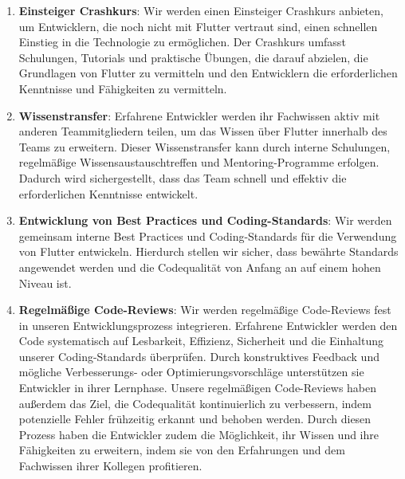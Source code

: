 \begin{enumerate}
    \item \textbf{Einsteiger Crashkurs}: Wir werden einen Einsteiger Crashkurs anbieten, um Entwicklern, die noch nicht mit Flutter vertraut sind, einen schnellen Einstieg in die Technologie zu ermöglichen. Der Crashkurs umfasst Schulungen, Tutorials und praktische Übungen, die darauf abzielen, die Grundlagen von Flutter zu vermitteln und den Entwicklern die erforderlichen Kenntnisse und Fähigkeiten zu vermitteln.
    \item \textbf{Wissenstransfer}: Erfahrene Entwickler werden ihr Fachwissen aktiv mit anderen Teammitgliedern teilen, um das Wissen über Flutter innerhalb des Teams zu erweitern. Dieser Wissenstransfer kann durch interne Schulungen, regelmäßige Wissensaustauschtreffen und Mentoring-Programme erfolgen. Dadurch wird sichergestellt, dass das Team schnell und effektiv die erforderlichen Kenntnisse entwickelt.
    \item \textbf{Entwicklung von Best Practices und Coding-Standards}: Wir werden gemeinsam interne Best Practices und Coding-Standards für die Verwendung von Flutter entwickeln. Hierdurch stellen wir sicher, dass bewährte Standards angewendet werden und die Codequalität von Anfang an auf einem hohen Niveau ist.
    \item \textbf{Regelmäßige Code-Reviews}: Wir werden regelmäßige Code-Reviews fest in unseren Entwicklungsprozess integrieren. Erfahrene Entwickler werden den Code systematisch auf Lesbarkeit, Effizienz, Sicherheit und die Einhaltung unserer Coding-Standards überprüfen. Durch konstruktives Feedback und mögliche Verbesserungs- oder Optimierungsvorschläge unterstützen sie Entwickler in ihrer Lernphase. Unsere regelmäßigen Code-Reviews haben außerdem das Ziel, die Codequalität kontinuierlich zu verbessern, indem potenzielle Fehler frühzeitig erkannt und behoben werden. Durch diesen Prozess haben die Entwickler zudem die Möglichkeit, ihr Wissen und ihre Fähigkeiten zu erweitern, indem sie von den Erfahrungen und dem Fachwissen ihrer Kollegen profitieren.
\end{enumerate}

